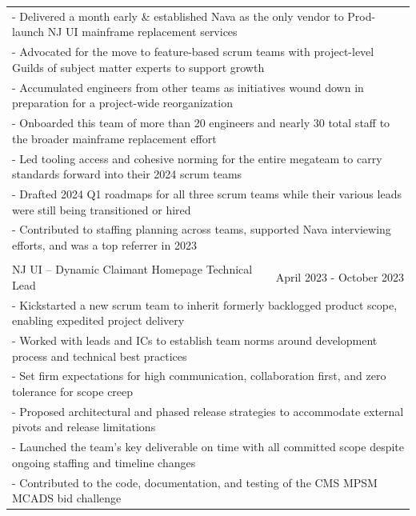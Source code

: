 \documentclass[letterpaper]{article}
\begin{document}
\begin{center}
\begin{tabular}{p{}p{}r}
			  \multicolumn{3}{p{\textwidth}}{\quad\quad - Delivered a month early \& established Nava as the only vendor to Prod-launch NJ UI mainframe replacement services} \\
			  \multicolumn{3}{p{\textwidth}}{\quad\quad - Advocated for the move to feature-based scrum teams with project-level Guilds of subject matter experts to support growth} \\
			  \multicolumn{3}{p{\textwidth}}{\quad\quad - Accumulated engineers from other teams as initiatives wound down in preparation for a project-wide reorganization} \\
			  \multicolumn{3}{p{\textwidth}}{\quad\quad - Onboarded this team of more than 20 engineers and nearly 30 total staff to the broader mainframe replacement effort} \\
			  \multicolumn{3}{p{\textwidth}}{\quad\quad - Led tooling access and cohesive norming for the entire megateam to carry standards forward into their 2024 scrum teams} \\
			  \multicolumn{3}{p{\textwidth}}{\quad\quad - Drafted 2024 Q1 roadmaps for all three scrum teams while their various leads were still being transitioned or hired} \\
			  \multicolumn{3}{p{\textwidth}}{\quad\quad - Contributed to staffing planning across teams, supported Nava interviewing efforts, and was a top referrer in 2023} 
		  \\
		  \\		%
			  \multicolumn{2}{p{0.5\textwidth}}{\quad NJ UI -- Dynamic Claimant Homepage Technical Lead}
			  &
			  {April 2023 - October 2023 \quad\quad\quad\quad}
		  \\
			  \multicolumn{3}{p{\textwidth}}{\quad\quad - Kickstarted a new scrum team to inherit formerly backlogged product scope, enabling expedited project delivery} \\
			  \multicolumn{3}{p{\textwidth}}{\quad\quad - Worked with leads and ICs to establish team norms around development process and technical best practices} \\
			  \multicolumn{3}{p{\textwidth}}{\quad\quad - Set firm expectations for high communication, collaboration first, and zero tolerance for scope creep} \\
			  \multicolumn{3}{p{\textwidth}}{\quad\quad - Proposed architectural and phased release strategies to accommodate external pivots and release limitations} \\
			  \multicolumn{3}{p{\textwidth}}{\quad\quad - Launched the team's key deliverable on time with all committed scope despite ongoing staffing and timeline changes} \\
			  \multicolumn{3}{p{\textwidth}}{\quad\quad - Contributed to the code, documentation, and testing of the CMS MPSM MCADS bid challenge } 


\end{tabular}
\end{center}
\end{document}
